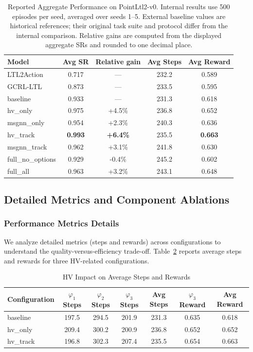 \documentclass[journal]{IEEEtran}
\begin{document}
\begin{table}[t]
\centering
\caption{Reported Aggregate Performance on PointLtl2-v0. Internal results use 500 episodes per seed, averaged over seeds 1--5. External baseline values are historical references; their original task suite and protocol differ from the internal comparison. Relative gains are computed from the displayed aggregate SRs and rounded to one decimal place.}
\label{tab:overall_performance}
\begin{tabular}{@{}lcccc@{}}
\toprule
\textbf{Model} & \textbf{Avg SR} & \textbf{Relative gain} & \textbf{Avg Steps} & \textbf{Avg Reward} \\ \midrule
LTL2Action & 0.717 & --- & 232.2 & 0.589 \\
GCRL-LTL & 0.873 & --- & 233.5 & 0.595 \\ \midrule
baseline & 0.933 & --- & 231.3 & 0.618 \\
hv\_only & 0.975 & +4.5\% & 236.8 & 0.652 \\
msgnn\_only & 0.954 & +2.3\% & 240.3 & 0.636 \\
hv\_track & \textbf{0.993} & \textbf{+6.4\%} & 235.5 & \textbf{0.663} \\
msgnn\_track & 0.962 & +3.1\% & 241.8 & 0.630 \\
full\_no\_options & 0.929 & -0.4\% & 245.2 & 0.602 \\
full\_all & 0.963 & +3.2\% & 243.1 & 0.648 \\ \bottomrule
\end{tabular}
\end{table}

\subsection{Detailed Metrics and Component Ablations}
\label{sec:extended_ablation}

\subsubsection{Performance Metrics Details}

We analyze detailed metrics (steps and rewards) across configurations to understand the quality-versus-efficiency trade-off. Table~\ref{tab:hv-steps-rewards} reports average steps and rewards for three HV-related configurations.

\begin{table}[t]
\centering
\caption{HV Impact on Average Steps and Rewards}
\label{tab:hv-steps-rewards}
\begin{tabular}{@{}lcccccc@{}}
	\toprule
	\textbf{Configuration} & \textbf{$\varphi_1$ Steps} & \textbf{$\varphi_2$ Steps} & \textbf{$\varphi_3$ Steps} & \textbf{Avg Steps} & \textbf{$\varphi_3$ Reward} & \textbf{Avg Reward} \\ \midrule
baseline & 197.5 & 294.5 & 201.9 & 231.3 & 0.635 & 0.618 \\
hv\_only & 209.4 & 300.2 & 200.9 & 236.8 & 0.652 & 0.652 \\
hv\_track & 196.8 & 302.3 & 207.4 & 235.5 & 0.654 & 0.663 \\ \bottomrule
\end{tabular}
\end{table}
\end{document}
